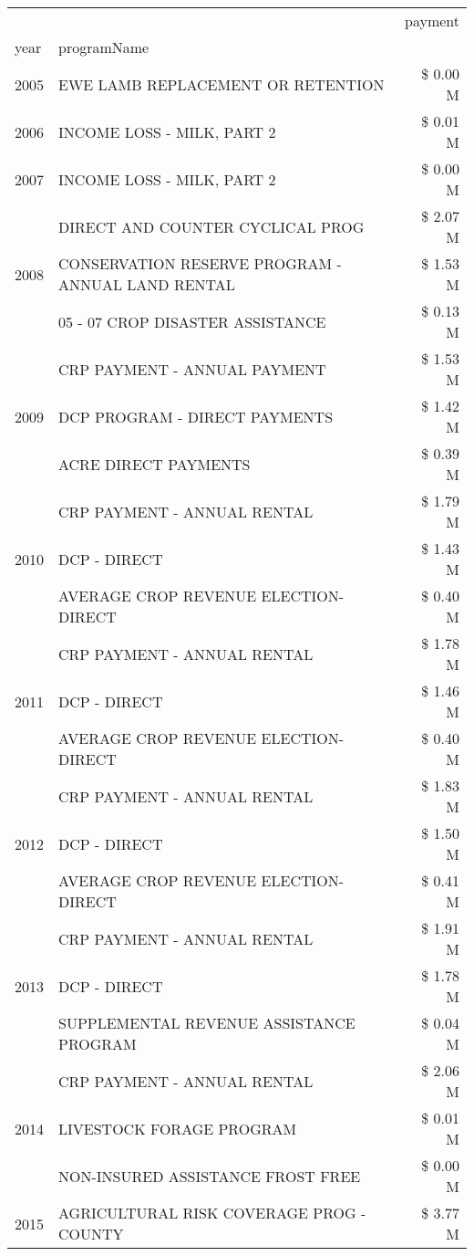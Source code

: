 \begin{tabular}{llr}
\toprule
 &  & payment \\
year & programName &  \\
\midrule
2005 & EWE LAMB REPLACEMENT OR RETENTION & \$ 0.00 M \\
\cline{1-3}
2006 & INCOME LOSS - MILK, PART 2 & \$ 0.01 M \\
\cline{1-3}
2007 & INCOME LOSS - MILK, PART 2 & \$ 0.00 M \\
\cline{1-3}
\multirow[t]{3}{*}{2008} & DIRECT AND COUNTER CYCLICAL PROG & \$ 2.07 M \\
 & CONSERVATION RESERVE PROGRAM - ANNUAL LAND RENTAL & \$ 1.53 M \\
 & 05 - 07 CROP DISASTER ASSISTANCE & \$ 0.13 M \\
\cline{1-3}
\multirow[t]{3}{*}{2009} & CRP PAYMENT - ANNUAL PAYMENT & \$ 1.53 M \\
 & DCP PROGRAM - DIRECT PAYMENTS & \$ 1.42 M \\
 & ACRE DIRECT PAYMENTS & \$ 0.39 M \\
\cline{1-3}
\multirow[t]{3}{*}{2010} & CRP PAYMENT - ANNUAL RENTAL & \$ 1.79 M \\
 & DCP - DIRECT & \$ 1.43 M \\
 & AVERAGE CROP REVENUE ELECTION-DIRECT & \$ 0.40 M \\
\cline{1-3}
\multirow[t]{3}{*}{2011} & CRP PAYMENT - ANNUAL RENTAL & \$ 1.78 M \\
 & DCP - DIRECT & \$ 1.46 M \\
 & AVERAGE CROP REVENUE ELECTION-DIRECT & \$ 0.40 M \\
\cline{1-3}
\multirow[t]{3}{*}{2012} & CRP PAYMENT - ANNUAL RENTAL & \$ 1.83 M \\
 & DCP - DIRECT & \$ 1.50 M \\
 & AVERAGE CROP REVENUE ELECTION-DIRECT & \$ 0.41 M \\
\cline{1-3}
\multirow[t]{3}{*}{2013} & CRP PAYMENT - ANNUAL RENTAL & \$ 1.91 M \\
 & DCP - DIRECT & \$ 1.78 M \\
 & SUPPLEMENTAL REVENUE ASSISTANCE PROGRAM & \$ 0.04 M \\
\cline{1-3}
\multirow[t]{3}{*}{2014} & CRP PAYMENT - ANNUAL RENTAL & \$ 2.06 M \\
 & LIVESTOCK FORAGE PROGRAM & \$ 0.01 M \\
 & NON-INSURED ASSISTANCE FROST FREE & \$ 0.00 M \\
\cline{1-3}
\multirow[t]{3}{*}{2015} & AGRICULTURAL RISK COVERAGE PROG - COUNTY & \$ 3.77 M \\

\end{tabular}
